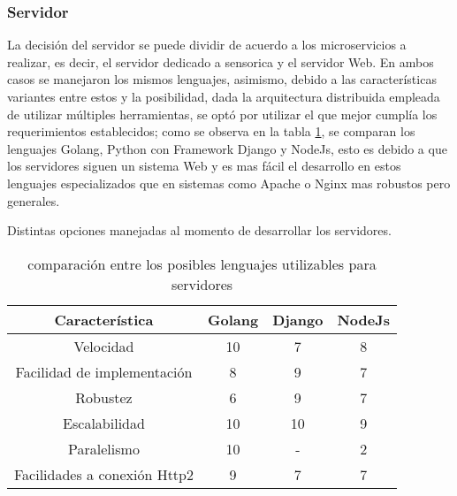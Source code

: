     \subsubsection{Servidor}
    La decisión del servidor se puede  dividir de acuerdo a los
    microservicios a realizar, es decir, el servidor dedicado a sensorica y
    el servidor Web. En ambos casos se manejaron los mismos lenguajes, asimismo, debido a
    las características variantes entre estos y la posibilidad, dada la arquitectura
    distribuida empleada de utilizar múltiples herramientas, se optó por utilizar
    el que mejor cumplía los requerimientos establecidos; como se observa en la
    tabla \ref{tab:LenguajesServidor}, se comparan los lenguajes Golang, Python
    con Framework Django y NodeJs, esto es debido a que los servidores siguen un
    sistema Web y es mas fácil el desarrollo en estos lenguajes especializados que
    en sistemas como Apache o Nginx mas robustos pero generales.

    \begin{table}[ht]
        \caption[Comparativa de posibles lenguajes nivel servidor]{comparación entre
        los posibles lenguajes utilizables para servidores}
        \label{tab:LenguajesServidor}
        \begin{center}
            Distintas opciones manejadas al momento de desarrollar los servidores.\\

            \vspace{0.3cm}
            \begin{tabular}{|c|c|c|c|}
                \hline
                Característica              & Golang & Django & NodeJs\\\hline
                Velocidad                   & 10    & 7     &   8   \\\hline
                Facilidad de implementación & 8     & 9     &  7\\\hline
                Robustez                    & 6     & 9     & 7 \\\hline
                Escalabilidad               & 10    & 10    & 9 \\\hline
                Paralelismo                 & 10    & -     & 2 \\\hline
                Facilidades a conexión Http2& 9     &7      & 7 \\
                \hline
            \end{tabular}
        \end{center}
    \end{table}

